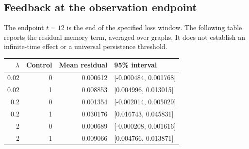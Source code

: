 \documentclass[preprint,11pt,sort&compress]{elsarticle}
\begin{document}
\subsection{Feedback at the observation endpoint}
The endpoint $t=12$ is the end of the specified loss window. The following table reports the residual memory term, averaged over graphs. It does not establish an infinite-time effect or a universal persistence threshold.
\par\medskip
\begin{center}\begin{tabular}{rrrl}\toprule $\lambda$ & Control & Mean residual & 95\% interval\\\midrule
0.02 & 0 & 0.000612 & [-0.000484, 0.001768]\\
0.02 & 1 & 0.008853 & [0.004996, 0.013015]\\
0.2 & 0 & 0.001354 & [-0.002014, 0.005029]\\
0.2 & 1 & 0.030176 & [0.016743, 0.045831]\\
2 & 0 & 0.000689 & [-0.000208, 0.001616]\\
2 & 1 & 0.009066 & [0.004766, 0.013871]\\
\bottomrule\end{tabular}\end{center}
\end{document}
